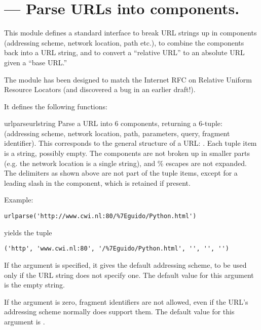 \section{ ---
         Parse URLs into components.}




This module defines a standard interface to break URL strings up in
components (addressing scheme, network location, path etc.), to combine
the components back into a URL string, and to convert a ``relative
URL'' to an absolute URL given a ``base URL.''

The module has been designed to match the Internet RFC on Relative
Uniform Resource Locators (and discovered a bug in an earlier
draft!).

It defines the following functions:

\begin{funcdesc}{urlparse}{urlstring}
Parse a URL into 6 components, returning a 6-tuple: (addressing
scheme, network location, path, parameters, query, fragment
identifier).  This corresponds to the general structure of a URL:
.
Each tuple item is a string, possibly empty.
The components are not broken up in smaller parts (e.g. the network
location is a single string), and \% escapes are not expanded.
The delimiters as shown above are not part of the tuple items,
except for a leading slash in the  component, which is
retained if present.

Example:

\begin{verbatim}
urlparse('http://www.cwi.nl:80/%7Eguido/Python.html')
\end{verbatim}

yields the tuple

\begin{verbatim}
('http', 'www.cwi.nl:80', '/%7Eguido/Python.html', '', '', '')
\end{verbatim}

If the  argument is specified, it gives the
default addressing scheme, to be used only if the URL string does not
specify one.  The default value for this argument is the empty string.

If the  argument is zero, fragment identifiers
are not allowed, even if the URL's addressing scheme normally does
support them.  The default value for this argument is .
\end{funcdesc}

